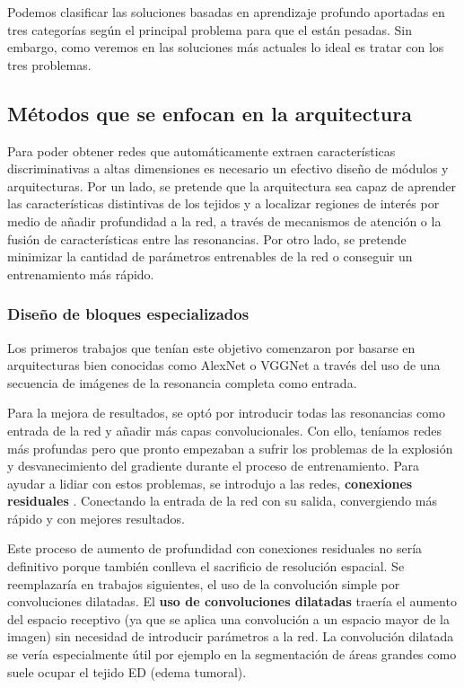 	Podemos clasificar las soluciones basadas en aprendizaje profundo aportadas en tres categorías según el principal problema para que el están pesadas. Sin embargo, como veremos en las soluciones más actuales lo ideal es tratar con los tres problemas.
	
	\subsection{Métodos que se enfocan en la arquitectura}
		
		 Para poder obtener redes que automáticamente extraen características discriminativas a altas dimensiones es necesario un efectivo diseño de módulos y arquitecturas. Por un lado, se pretende que la arquitectura sea capaz de aprender las características distintivas de los tejidos y a localizar regiones de interés por medio de añadir profundidad a la red, a través de mecanismos de atención o la fusión de características entre las resonancias. Por otro lado, se pretende minimizar la cantidad de parámetros entrenables de la red o conseguir un entrenamiento más rápido.
		 
		\subsubsection{Diseño de bloques especializados}
			
			Los primeros trabajos que tenían este objetivo comenzaron por basarse en arquitecturas bien conocidas como AlexNet o VGGNet a través del uso de una secuencia de imágenes de la resonancia completa como entrada.
			
			Para la mejora de resultados, se optó por introducir todas las resonancias como entrada de la red y añadir más capas convolucionales. Con ello, teníamos redes más profundas pero que pronto empezaban a sufrir los problemas de la explosión y desvanecimiento del gradiente durante el proceso de entrenamiento. Para ayudar a lidiar con estos problemas, se introdujo a las redes, \textbf{conexiones residuales} \cite{chang2016fully}. Conectando la entrada de la red con su salida, convergiendo más rápido y con mejores resultados. 
			
			Este proceso de aumento de profundidad con conexiones residuales no sería definitivo porque también conlleva el sacrificio de resolución espacial. Se reemplazaría en trabajos siguientes, el uso de la convolución simple por convoluciones dilatadas. El \textbf{uso de convoluciones dilatadas} traería el aumento del espacio receptivo (ya que se aplica una convolución a un espacio mayor de la imagen) sin necesidad de introducir parámetros a la red. La convolución dilatada se vería especialmente útil por ejemplo en la segmentación de áreas grandes como suele ocupar el tejido ED (edema tumoral). 
			
